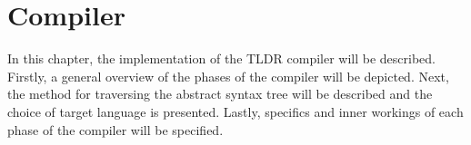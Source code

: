 \chapter{Compiler}{In this chapter, the implementation of the TLDR compiler will be described. Firstly, a general overview of the phases of the compiler will be depicted. Next, the method for traversing the abstract syntax tree will be described and the choice of target language is presented. Lastly, specifics and inner workings of each phase of the compiler will be specified.}
\label{part:implementation}







